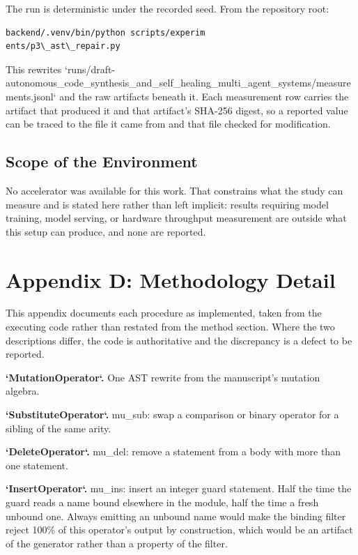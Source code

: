\documentclass{article}
\begin{document}
The run is deterministic under the recorded seed. From the repository root:


\begin{scriptsize}
\begin{verbatim}
backend/.venv/bin/python scripts/experim
ents/p3\_ast\_repair.py
\end{verbatim}
\end{scriptsize}


This rewrites `runs/draft-autonomous\_code\_synthesis\_and\_self\_healing\_multi\_agent\_systems/measurements.jsonl` and the raw artifacts beneath it. Each measurement row carries the artifact that produced it and that artifact's SHA-256 digest, so a reported value can be traced to the file it came from and that file checked for modification.


\subsection{Scope of the Environment}


No accelerator was available for this work. That constrains what the study can measure and is stated here rather than left implicit: results requiring model training, model serving, or hardware throughput measurement are outside what this setup can produce, and none are reported.




\section{Appendix D: Methodology Detail}


This appendix documents each procedure as implemented, taken from the executing code rather than restated from the method section. Where the two descriptions differ, the code is authoritative and the discrepancy is a defect to be reported.

\textbf{`MutationOperator`.} One AST rewrite from the manuscript's mutation algebra.

\textbf{`SubstituteOperator`.} mu\_sub: swap a comparison or binary operator for a sibling of the same arity.

\textbf{`DeleteOperator`.} mu\_del: remove a statement from a body with more than one statement.

\textbf{`InsertOperator`.} mu\_ins: insert an integer guard statement. Half the time the guard reads a name bound elsewhere in the module, half the time a fresh unbound one. Always emitting an unbound name would make the binding filter reject 100\% of this operator's output by construction, which would be an artifact of the generator rather than a property of the filter.
\end{document}

